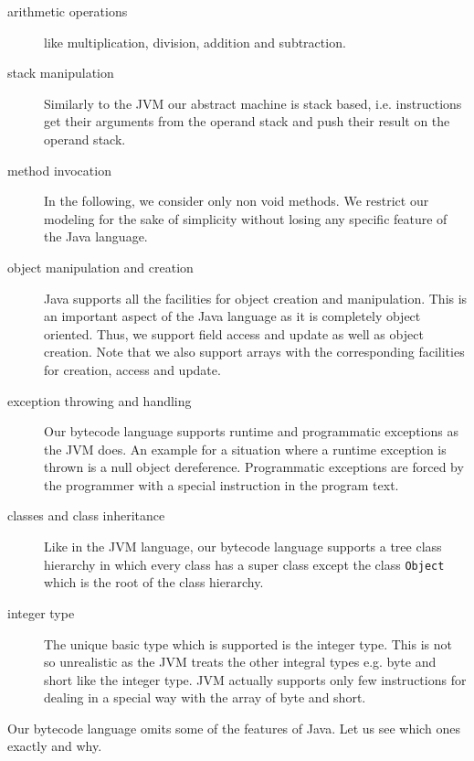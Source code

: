 \begin{description} 
   \item  [arithmetic operations] like multiplication, division, addition and subtraction. 

   \item  [stack manipulation] Similarly to the JVM  our abstract machine is stack based, i.e. instructions
          get their arguments from the operand stack and push their result on the  operand stack.

   \item  [method invocation] In the following, we consider only  non void methods. 
          We restrict our modeling for the sake of simplicity without losing any specific feature of the Java language.
          
   \item  [object manipulation and creation] 
          Java supports all the facilities for object creation and manipulation.
	  This is an important aspect of the Java language as it is completely object oriented.
	  Thus, we support field access and update as well as object creation. Note that we also 
	  support arrays with the corresponding facilities for creation, access and update. 

   \item  [exception throwing and handling] Our bytecode language supports runtime and programmatic exceptions as the JVM does.
	  An example for a situation where a runtime exception is thrown is a null object dereference.  Programmatic exceptions
	  are forced by the programmer with a special instruction in the program text.
   
   \item  [classes and class inheritance] Like in the JVM language, our bytecode language supports  a tree class hierarchy in which every class 
          has a super class except the class \texttt{Object} which is the root of the class hierarchy.

   \item  [integer type] The unique basic type which is supported is the integer type.
          This is not so unrealistic as the JVM
	  treats the other integral types e.g. byte and short like the integer type. 
	  JVM actually supports only few instructions 
          for dealing in a special way with the array of byte and short.
	  
\end{description} 
 

 Our bytecode language omits some of the features of Java. Let us see which ones exactly and why.

